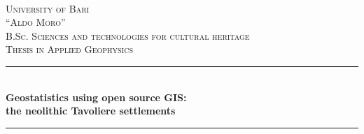     \thispagestyle{empty}
    \begin{titlepage}
        \newcommand{\HRule}{\rule{\linewidth}{0.5mm}} %

        \center %
         

        \textsc{
            ~\\
            ~\\
            ~\\
            ~\\
            ~\\
            ~\\
            \LARGE University of Bari\\\Large``Aldo Moro''
        }\\[1.5cm] %
        \textsc{\Large B.Sc. Sciences and technologies for cultural heritage}\\[0.5cm] %
        \textsc{\large Thesis in Applied Geophysics}\\[0.5cm] %


        \HRule \\[0.4cm]
        { \Large \bfseries Geostatistics using open source GIS:\\the neolithic Tavoliere settlements}\\[0.4cm] %
        \HRule \\[1.5cm]
         


\end{titlepage}
